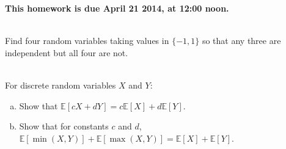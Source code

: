 \documentclass[]{article}
\newif\ifsolutions
\renewcommand{\answer}[1]{{\color{mydarkblue}\textbf{Solution:}#1}}
\begin{document}
\maketitle
{}
\vspace{0.5em}
{\Large{\textbf{This homework is due April 21 2014, at 12:00 noon.}}}

\begin{qunlist}

\\
Find four random variables taking values in $\{-1,1\}$ so that any three are independent but all four are not.

\ifsolutions{ \answer{
Let $X_1,X_2,X_3,X_4$ be i.i.d random variables with $P(X_i=1)=P(X_i=-1)=1/2$. Let $X_4=X_1X_2X_3$. Check that $X_1,X_2,X_3,X_4$ are four random variables such that any three are independent but all four are not. For example, they are not all independent because
\[
P(X_1=1,X_2=1,X_3=1,X_4=1)=1/8 \neq
P(X_1=1)P(X_2=1)P(X_3=1)P(X_4=1)
\]
}}
\fi

 \\ For discrete random variables $X$ and $Y$:
\begin{enumerate}[a)]

\qpart
\item Show that $\mathbb{E}[cX + dY] = c\mathbb{E}[X] + d \mathbb{E}[Y]$.

\ifsolutions{ \answer{ Beginning with the LHS:
		\begin{align*}
		\mathbb{E}[cX + dY] & = \sum_{x,y} (cx+dy) \mathbb{P}(x,y) \\
		& = c\sum_{x,y} x \mathbb{P}(x,y) + d\sum_{x,y} y \mathbb{P}(x,y) \\
		& = c \sum_x x \sum_y \mathbb{P}(x,y) + d \sum_y y \sum_x \mathbb{P}(x,y) \\
		& = c\sum_x x \mathbb{P}(x) + d\sum_y y \mathbb{P}(y) \\
		& = c\mathbb{E}[X] + d \mathbb{E}[Y].
		\end{align*}
}}
\fi


\qpart
\item Show that for constants $c$ and $d$, $\mathbb{E}[\min(X,Y)] + \mathbb{E}[\max(X,Y)] = \mathbb{E}[X] + \mathbb{E}[Y]$.





\end{enumerate}
\end{qunlist}
\end{document}
